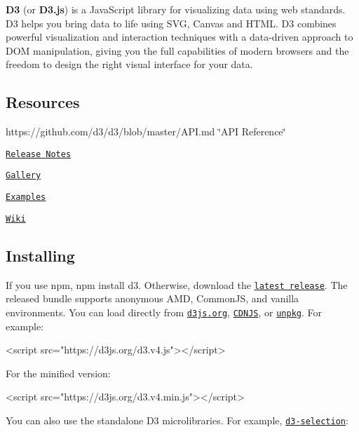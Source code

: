\href{https://d3js.org}{\tt }

{\bfseries D3} (or {\bfseries D3.\+js}) is a Java\+Script library for visualizing data using web standards. D3 helps you bring data to life using S\+VG, Canvas and H\+T\+ML. D3 combines powerful visualization and interaction techniques with a data-\/driven approach to D\+OM manipulation, giving you the full capabilities of modern browsers and the freedom to design the right visual interface for your data.

\subsection*{Resources}


\begin{DoxyItemize}
\item https\+://github.com/d3/d3/blob/master/\+A\+P\+I.\+md \char`\"{}\+A\+P\+I Reference\char`\"{}
\item \href{https://github.com/d3/d3/releases}{\tt Release Notes}
\item \href{https://github.com/d3/d3/wiki/Gallery}{\tt Gallery}
\item \href{https://bl.ocks.org/mbostock}{\tt Examples}
\item \href{https://github.com/d3/d3/wiki}{\tt Wiki}
\end{DoxyItemize}

\subsection*{Installing}

If you use npm, {\ttfamily npm install d3}. Otherwise, download the \href{https://github.com/d3/d3/releases/latest}{\tt latest release}. The released bundle supports anonymous A\+MD, Common\+JS, and vanilla environments. You can load directly from \href{https://d3js.org}{\tt d3js.\+org}, \href{https://cdnjs.com/libraries/d3}{\tt C\+D\+N\+JS}, or \href{https://unpkg.com/d3/}{\tt unpkg}. For example\+:


\begin{DoxyCode}
<script src="https://d3js.org/d3.v4.js"></script>
\end{DoxyCode}


For the minified version\+:


\begin{DoxyCode}
<script src="https://d3js.org/d3.v4.min.js"></script>
\end{DoxyCode}


You can also use the standalone D3 microlibraries. For example, \href{https://github.com/d3/d3-selection}{\tt d3-\/selection}\+:


